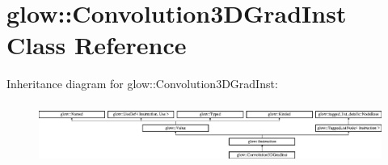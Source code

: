 \hypertarget{classglow_1_1_convolution3_d_grad_inst}{}\section{glow\+:\+:Convolution3\+D\+Grad\+Inst Class Reference}
\label{classglow_1_1_convolution3_d_grad_inst}
Inheritance diagram for glow\+:\+:Convolution3\+D\+Grad\+Inst\+:\begin{figure}[H]
\begin{center}
\leavevmode
\includegraphics[height=1.991111cm]{classglow_1_1_convolution3_d_grad_inst}
\end{center}
\end{figure}
